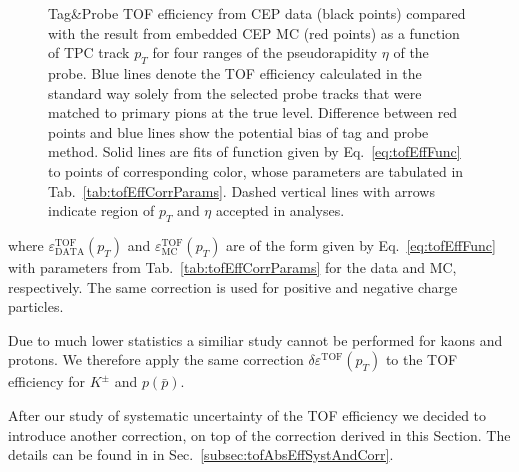 \begin{figure}[H]
{\begin{subfigure}[b]{\linewidth}
  \end{subfigure}
}%
\caption[Tag\&Probe TOF efficiency from CEP data compared with the result from embedded CEP MC (divided w.r.t. $\eta$ of the probe).]%
    {Tag\&Probe TOF efficiency from CEP data (black points) compared with the result from embedded CEP MC (red points) as a function of TPC track $p_{T}$ for four ranges of the pseudorapidity $\eta$ of the probe. Blue lines denote the TOF efficiency calculated in the standard way solely from the selected probe tracks that were matched to primary pions at the true level. Difference between red points and blue lines show the potential bias of tag and probe method. Solid lines are fits of function given by Eq.~\eqref{eq:tofEffFunc} to points of corresponding color, whose parameters are tabulated in Tab.~\ref{tab:tofEffCorrParams}. Dashed vertical lines with arrows indicate region of $p_{T}$ and $\eta$ accepted in analyses.}\label{fig:tofEffSyst_etaBins}%
\end{figure}%
%
%
%
%
\noindent where $\varepsilon^{\text{TOF}}_{\text{DATA}}(p_{T})$ and $\varepsilon^{\text{TOF}}_{\text{MC}}(p_{T})$ are of the form given by Eq.~\eqref{eq:tofEffFunc} with parameters from Tab.~\ref{tab:tofEffCorrParams} for the data and MC, respectively. The same correction is used for positive and negative charge particles.

Due to much lower statistics a similiar study cannot be performed for kaons and protons. We therefore apply the same correction $\delta\varepsilon^{\text{TOF}}(p_{T})$ to the TOF efficiency for $K^{\pm}$ and $p(\bar{p})$.

After our study of systematic uncertainty of the TOF efficiency we decided to introduce another correction, on top of the correction derived in this Section. The details can be found in in Sec.~\ref{subsec:tofAbsEffSystAndCorr}.
 

